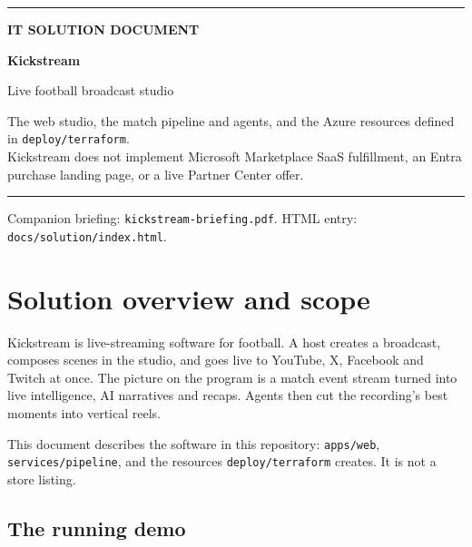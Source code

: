 \documentclass[11pt]{article}
\begin{document}
\begin{titlepage}
\thispagestyle{empty}
{\color{CommBlue}\rule{\textwidth}{4pt}}
\vspace{1.6em}
{\color{CommBlue}\fontsize{12}{16}\selectfont\bfseries IT SOLUTION DOCUMENT\par}
\vspace{0.8em}
{\KickstreamTitleSize\bfseries Kickstream\par}
\vspace{0.4em}
{\fontsize{16}{22}\selectfont Live football broadcast studio\par}
\vspace{1.2em}
\color{Muted}
The web studio, the match pipeline and agents, and the Azure resources
defined in \texttt{deploy/terraform}.\\[0.4em]
Kickstream does not implement Microsoft Marketplace SaaS fulfillment,
an Entra purchase landing page, or a live Partner Center offer.\par
\vspace{1.4em}
{\color{CommBlue}\rule{48pt}{3pt}\par}
\vfill
{\small\color{Muted} Companion briefing: \texttt{kickstream-briefing.pdf}.
HTML entry: \texttt{docs/solution/index.html}.\par}
\end{titlepage}

\tableofcontents
\vspace{1em}

\section{Solution overview and scope}

Kickstream is live-streaming software for football.
A host creates a broadcast, composes scenes in the studio, and goes live to
YouTube, X, Facebook and Twitch at once.
The picture on the program is a match event stream turned into live intelligence,
AI narratives and recaps.
Agents then cut the recording's best moments into vertical reels.

This document describes the software in this repository: \texttt{apps/web},
\texttt{services/pipeline}, and the resources \texttt{deploy/terraform} creates.
It is not a store listing.

\subsection{The running demo}
\end{document}
